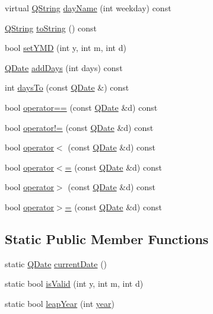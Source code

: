 \begin{DoxyCompactItemize}
virtual \mbox{\hyperlink{class_q_string}{Q\+String}} \mbox{\hyperlink{class_q_date_a08320176a833c05ff718155da1177381}{day\+Name}} (int weekday) const
\item 
\mbox{\hyperlink{class_q_string}{Q\+String}} \mbox{\hyperlink{class_q_date_aebc53b28c073570214cfc6f1376cbcd5}{to\+String}} () const
\item 
bool \mbox{\hyperlink{class_q_date_ae25b0507f1694495d64ff068b0baa50e}{set\+Y\+MD}} (int y, int m, int d)
\item 
\mbox{\hyperlink{class_q_date}{Q\+Date}} \mbox{\hyperlink{class_q_date_aea0944d5825cb73f4bdad70577ba9a31}{add\+Days}} (int days) const
\item 
int \mbox{\hyperlink{class_q_date_a4089a34058a747a78a1f5f3b3ea4ad0d}{days\+To}} (const \mbox{\hyperlink{class_q_date}{Q\+Date}} \&) const
\item 
bool \mbox{\hyperlink{class_q_date_a4abe1def3e95c8846bf135df79037bb7}{operator==}} (const \mbox{\hyperlink{class_q_date}{Q\+Date}} \&d) const
\item 
bool \mbox{\hyperlink{class_q_date_a35f6b9aa837b676c740b22c0d8e8310b}{operator!=}} (const \mbox{\hyperlink{class_q_date}{Q\+Date}} \&d) const
\item 
bool \mbox{\hyperlink{class_q_date_ade64fa826c52e7cb379d61288d987047}{operator$<$}} (const \mbox{\hyperlink{class_q_date}{Q\+Date}} \&d) const
\item 
bool \mbox{\hyperlink{class_q_date_a8d7bb057cbf7627dd5918fbb88a41c1f}{operator$<$=}} (const \mbox{\hyperlink{class_q_date}{Q\+Date}} \&d) const
\item 
bool \mbox{\hyperlink{class_q_date_ab0f008d456c129bf19a7fb0dbd243868}{operator$>$}} (const \mbox{\hyperlink{class_q_date}{Q\+Date}} \&d) const
\item 
bool \mbox{\hyperlink{class_q_date_af7ef36b97ee8e9dd33a92d89c403e301}{operator$>$=}} (const \mbox{\hyperlink{class_q_date}{Q\+Date}} \&d) const
\end{DoxyCompactItemize}
\subsection*{Static Public Member Functions}
\begin{DoxyCompactItemize}
\item 
static \mbox{\hyperlink{class_q_date}{Q\+Date}} \mbox{\hyperlink{class_q_date_a7112e1452f46e40cf349f2e769887e1c}{current\+Date}} ()
\item 
static bool \mbox{\hyperlink{class_q_date_a837d8f55470c8d8fe41efe980b68ee86}{is\+Valid}} (int y, int m, int d)
\item 
static bool \mbox{\hyperlink{class_q_date_a77612a09d0fd5eb1ba99952cef5e9eaa}{leap\+Year}} (int \mbox{\hyperlink{class_q_date_a7ad4fc16e91f089391a4ea9710076839}{year}})
\end{DoxyCompactItemize}
